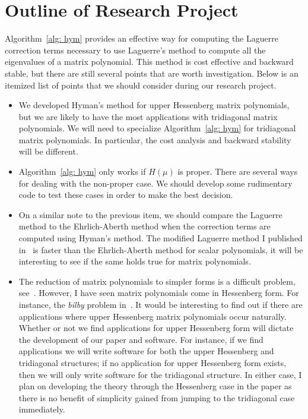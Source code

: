 \documentclass{article}
\begin{document}
\section{Outline of Research Project}
Algorithm~\ref{alg: hym} provides an effective way for computing the Laguerre correction terms necessary to use Laguerre's method to compute all the eigenvalues of a matrix polynomial. 
This method is cost effective and backward stable, but there are still several points that are worth investigation.
Below is an itemized list of points that we should consider during our research project.
\begin{itemize}
\item	We developed Hyman's method for upper Hessenberg matrix polynomials, but we are likely to have the most applications with tridiagonal matrix polynomials. 
	We will need to specialize Algorithm~\ref{alg: hym} for tridiagonal matrix polynomials. 
	In particular, the cost analysis and backward stability will be different.
\item	Algorithm~\ref{alg: hym} only works if $H(\mu)$ is proper. 
	There are several ways for dealing with the non-proper case. 
	We should develop some rudimentary code to test these cases in order to make the best decision.
\item	On a similar note to the previous item, we should compare the Laguerre method to the Ehrlich-Aberth method when the correction terms are computed using Hyman's method.
	The modified Laguerre method I published in~\cite{Cameron2018} is faster than the Ehrlich-Aberth method for scalar polynomials, it will be interesting to see if the same holds true for matrix polynomials. 
\item	The reduction of matrix polynomials to simpler forms is a difficult problem, see~\cite{Nakatsukasa2018}.
	However, I have seen matrix polynomials come in Hessenberg form.
	For instance, the \emph{bilby} problem in~\cite{Betcke2013}. 
	It would be interesting to find out if there are applications where upper Hessenberg matrix polynomials occur naturally. 
	Whether or not we find applications for upper Hessenberg form will dictate the development of our paper and software.
	For instance, if we find applications we will write software for both the upper Hessenberg and tridiagonal structures;
	if no application for upper Hessenberg form exists, then we will only write software for the tridiagonal structure.
	In either case, I plan on developing the theory through the Hessenberg case in the paper as there is no benefit of simplicity gained from jumping to the tridiagonal case immediately. 

\end{itemize}
\end{document}

